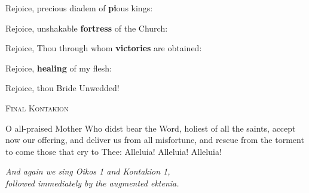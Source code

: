 \pagebreak



Rejoice, precious diadem of \textbf{pi}ous kings:


Rejoice, unshakable \textbf{fortress} of the Church:


Rejoice, Thou through whom \textbf{victories} are obtained:


Rejoice, \textbf{healing} of my flesh:


Rejoice, thou Bride Unwedded!

\begin{center}
  {\textsc{\color{Maroon}Final Kontakion}}
\end{center}

\Priest O all-praised Mother Who didst bear the Word, holiest of all the saints, accept now our offering, and deliver us from all misfortune, and rescue from the torment to come those that cry to Thee: Alleluia! Alleluia! Alleluia! \Thrice

\begin{center}
  {\color{Maroon}\emph{And again we sing Oikos 1 and Kontakion 1,\\followed immediately by the augmented ektenia.}}
\end{center}

\pagebreak

